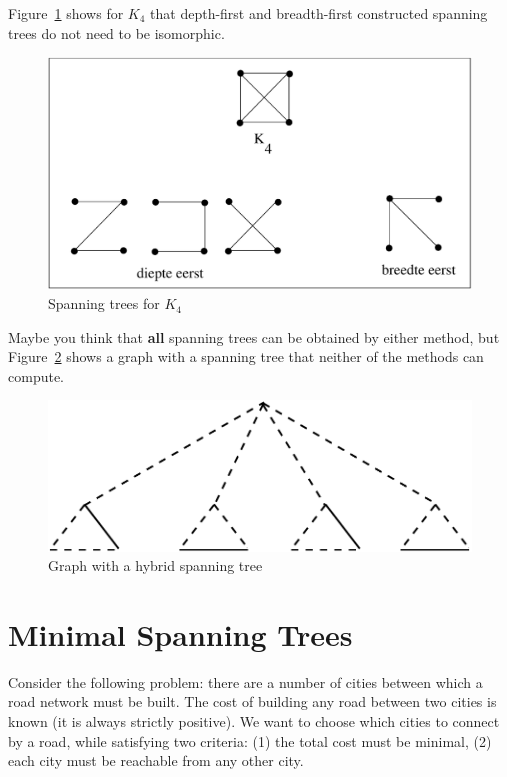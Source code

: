 Figure~\ref{opspannend2} shows for $K_{4}$ that depth-first and
breadth-first constructed spanning trees do not need to be isomorphic.

\begin{figure}[ht]
\begin{center}
\includegraphics[width=0.5\linewidth,keepaspectratio]{opspannend2}
\end{center}
\caption{Spanning trees for $K_{4}$\label{opspannend2}}
\end{figure}


Maybe you think that {\bf all} spanning trees can be obtained by
either method, but Figure~\ref{opspannend5} shows a graph with a
spanning tree that neither of the methods can compute.

\begin{figure}[ht]
\begin{center}
\includegraphics[width=0.5\linewidth,keepaspectratio]{opspannend5}
\end{center}
\caption{Graph with a hybrid spanning tree\label{opspannend5}}
\end{figure}

\section{Minimal Spanning Trees}

Consider the following problem: there are a number of cities between
which a road network must be built. The cost of building any road
between two cities is known (it is always strictly positive). We want
to choose which cities to connect by a road, while satisfying two
criteria: (1) the total cost must be minimal, (2) each city must be
reachable from any other city.

